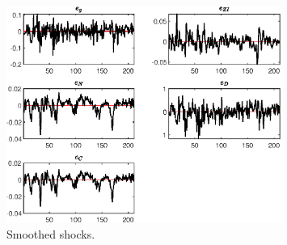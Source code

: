  
\begin{figure}[H]
\centering 
\includegraphics[width=0.80\textwidth]{BRS_growth_ext_comovement/graphs/BRS_growth_ext_comovement_SmoothedShocks1}
\caption{Smoothed shocks.}\label{Fig:SmoothedShocks:1}
\end{figure}


